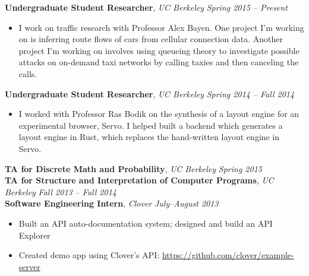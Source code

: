 \documentclass[9pt]{article}
\newenvironment{changemargin}[2]{%
  \begin{list}{}{%
      \setlength{\topsep}{0pt}%
      \setlength{\leftmargin}{#1}%
      \setlength{\rightmargin}{#2}%
      \setlength{\listparindent}{\parindent}%
      \setlength{\itemindent}{\parindent}%
      \setlength{\parsep}{\parskip}%
    }%
  \item[]}{\end{list}
}
\newenvironment{body} {
  \vspace*{-16pt}
  \begin{changemargin}{-0.25in}{-0.5in}
  }
  {\end{changemargin}
}
\begin{document}
\begin{body}
  \vspace{14pt}

  \textbf{Undergraduate Student Researcher}, \emph{UC Berkeley} \hfill \emph{Spring 2015 -- Present}\\
  \vspace*{-4pt}
  \begin{itemize} \itemsep -0pt  %
  \item I work on traffic research with Professor Alex Bayen. One project I'm
    working on is inferring route flows of cars from cellular connection
    data. Another project I'm working on involves using queueing theory to
    investigate possible attacks on on-demand taxi networks by calling taxies
    and then canceling the calls.
  \end{itemize}

  \textbf{Undergraduate Student Researcher}, \emph{UC Berkeley} \hfill \emph{Spring 2014 -- Fall 2014}\\
  \vspace*{-4pt}
  \begin{itemize} \itemsep -0pt  %
  \item I worked with Professor Ras Bodik on the synthesis of a layout engine
    for an experimental browser, Servo. I helped built a backend which generates
    a layout engine in Rust, which replaces the hand-written layout engine in
    Servo.
  \end{itemize}

  \textbf{TA for Discrete Math and Probability}, \emph{UC Berkeley} \hfill \emph{Spring 2015}\\

  \textbf{TA for Structure and Interpretation of Computer Programs}, \emph{UC Berkeley} \hfill \emph{Fall 2013 -- Fall 2014}\\

  \textbf{Software Engineering Intern}, \emph{Clover} \hfill \emph{July--August 2013}\\
  \vspace*{-4pt}
  \begin{itemize} \itemsep -0pt  %
  \item Built an API auto-documentation system; designed and build an API Explorer
  \item Created demo app using Clover's API:  \url{https://github.com/clover/example-server}
  \end{itemize}
\end{body}
\end{document}
